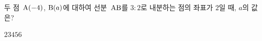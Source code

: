 두 점~$\mathrm{A}(-4)$, $\mathrm{B}(a)$에 대하여 선분~$\mathrm{AB}$를 $3:2$로 내분하는 점의 좌표가 $2$일 때, $a$의 값은?
\begin{choices32}{$2$}{$3$}{$4$}{$5$}{$6$}\end{choices32}
